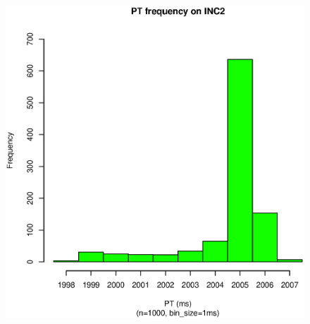 \begin{figure}[hp!]
{		\includegraphics[scale=0.43]{u_s_time/2_sec_pt_hist.eps}
		\label{fig:inc2_r3_hist_v5}
	}
\end{figure}
